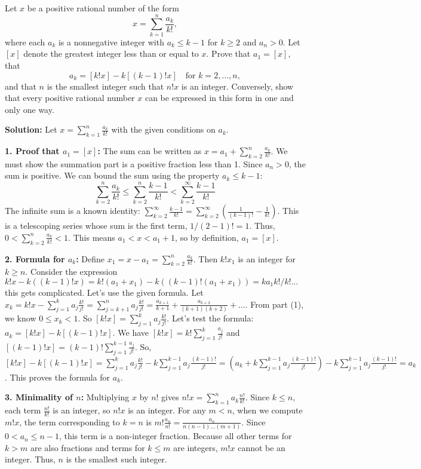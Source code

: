 \begin{problembox}
Let $x$ be a positive rational number of the form
\[
x = \sum_{k=1}^n \frac{a_k}{k!},
\]
where each $a_k$ is a nonnegative integer with $a_k \leq k - 1$ for $k \geq 2$ and $a_n > 0$. Let $[x]$ denote the greatest integer less than or equal to $x$. Prove that $a_1 = [x]$, that
\[
a_k = [k!x] - k[(k - 1)!x] \quad \text{for } k = 2, \dots, n,
\]
and that $n$ is the smallest integer such that $n!x$ is an integer. Conversely, show that every positive rational number $x$ can be expressed in this form in one and only one way.
\end{problembox}

\textbf{Solution:}
Let $x = \sum_{k=1}^n \frac{a_k}{k!}$ with the given conditions on $a_k$.

\textbf{1. Proof that $a_1 = [x]$:}
The sum can be written as $x = a_1 + \sum_{k=2}^n \frac{a_k}{k!}$. We must show the summation part is a positive fraction less than 1. Since $a_n > 0$, the sum is positive. We can bound the sum using the property $a_k \leq k-1$:
\[
\sum_{k=2}^n \frac{a_k}{k!} \leq \sum_{k=2}^n \frac{k-1}{k!} < \sum_{k=2}^{\infty} \frac{k-1}{k!}
\]
The infinite sum is a known identity: $\sum_{k=2}^{\infty} \frac{k-1}{k!} = \sum_{k=2}^{\infty} \left(\frac{1}{(k-1)!} - \frac{1}{k!}\right)$. This is a telescoping series whose sum is the first term, $1/(2-1)! = 1$.
Thus, $0 < \sum_{k=2}^n \frac{a_k}{k!} < 1$. This means $a_1 < x < a_1 + 1$, so by definition, $a_1 = [x]$.

\textbf{2. Formula for $a_k$:}
Define $x_1 = x - a_1 = \sum_{k=2}^n \frac{a_k}{k!}$. Then $k!x_1$ is an integer for $k \ge n$.
Consider the expression $k!x - k((k-1)!x) = k!(a_1+x_1) - k((k-1)!(a_1+x_1)) = ka_1k!/k! ...$ this gets complicated.
Let's use the given formula. Let $x_k = k!x - \sum_{j=1}^{k} a_j \frac{k!}{j!} = \sum_{j=k+1}^{n} a_j \frac{k!}{j!} = \frac{a_{k+1}}{k+1} + \frac{a_{k+2}}{(k+1)(k+2)} + \dots$.
From part (1), we know $0 \le x_k < 1$. So $[k!x] = \sum_{j=1}^{k} a_j \frac{k!}{j!}$.
Let's test the formula: $a_k = [k!x] - k[(k - 1)!x]$.
We have $[k!x] = k! \sum_{j=1}^k \frac{a_j}{j!}$ and $[(k-1)!x] = (k-1)! \sum_{j=1}^{k-1} \frac{a_j}{j!}$.
So, $[k!x] - k[(k-1)!x] = \sum_{j=1}^k a_j \frac{k!}{j!} - k \sum_{j=1}^{k-1} a_j \frac{(k-1)!}{j!} = \left(a_k + k\sum_{j=1}^{k-1} a_j \frac{(k-1)!}{j!}\right) - k\sum_{j=1}^{k-1} a_j \frac{(k-1)!}{j!} = a_k$.
This proves the formula for $a_k$.

\textbf{3. Minimality of $n$:}
Multiplying $x$ by $n!$ gives $n!x = \sum_{k=1}^n a_k \frac{n!}{k!}$. Since $k \le n$, each term $\frac{n!}{k!}$ is an integer, so $n!x$ is an integer.
For any $m < n$, when we compute $m!x$, the term corresponding to $k=n$ is $m! \frac{a_n}{n!} = \frac{a_n}{n(n-1)\dots(m+1)}$. Since $0 < a_n \le n-1$, this term is a non-integer fraction. Because all other terms for $k>m$ are also fractions and terms for $k\le m$ are integers, $m!x$ cannot be an integer. Thus, $n$ is the smallest such integer.

